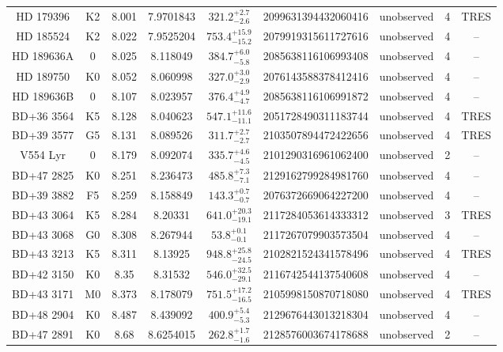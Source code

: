 \begin{table*}
\begin{tabular}{ccccccccc}
HD 179396 & K2 & 8.001 & 7.9701843 & $321.2^{+2.7}_{-2.6}$ & 2099631394432060416 & unobserved & 4 & TRES \\
HD 185524 & K2 & 8.022 & 7.9525204 & $753.4^{+15.9}_{-15.2}$ & 2079919315611727616 & unobserved & 4 & -- \\
HD 189636A & 0 & 8.025 & 8.118049 & $384.7^{+6.0}_{-5.8}$ & 2085638116106993408 & unobserved & 4 & -- \\
HD 189750 & K0 & 8.052 & 8.060998 & $327.0^{+3.0}_{-2.9}$ & 2076143588378412416 & unobserved & 4 & -- \\
HD 189636B & 0 & 8.107 & 8.023957 & $376.4^{+4.9}_{-4.7}$ & 2085638116106991872 & unobserved & 4 & -- \\
BD+36 3564 & K5 & 8.128 & 8.040623 & $547.1^{+11.6}_{-11.1}$ & 2051728490311183744 & unobserved & 4 & TRES \\
BD+39 3577 & G5 & 8.131 & 8.089526 & $311.7^{+2.7}_{-2.7}$ & 2103507894472422656 & unobserved & 4 & TRES \\
V554 Lyr & 0 & 8.179 & 8.092074 & $335.7^{+4.6}_{-4.5}$ & 2101290316961062400 & unobserved & 2 & -- \\
BD+47 2825 & K0 & 8.251 & 8.236473 & $485.8^{+7.3}_{-7.1}$ & 2129162799284981760 & unobserved & 4 & -- \\
BD+39 3882 & F5 & 8.259 & 8.158849 & $143.3^{+0.7}_{-0.7}$ & 2076372669064227200 & unobserved & 4 & -- \\
BD+43 3064 & K5 & 8.284 & 8.20331 & $641.0^{+20.3}_{-19.1}$ & 2117284053614333312 & unobserved & 3 & TRES \\
BD+43 3068 & G0 & 8.308 & 8.267944 & $53.8^{+0.1}_{-0.1}$ & 2117267079903573504 & unobserved & 4 & -- \\
BD+43 3213 & K5 & 8.311 & 8.13925 & $948.8^{+25.8}_{-24.5}$ & 2102821524341578496 & unobserved & 4 & TRES \\
BD+42 3150 & K0 & 8.35 & 8.31532 & $546.0^{+32.5}_{-29.1}$ & 2116742544137540608 & unobserved & 4 & -- \\
BD+43 3171 & M0 & 8.373 & 8.178079 & $751.5^{+17.2}_{-16.5}$ & 2105998150870718080 & unobserved & 4 & TRES \\
BD+48 2904 & K0 & 8.487 & 8.439092 & $400.9^{+5.4}_{-5.3}$ & 2129676443013218304 & unobserved & 4 & -- \\
BD+47 2891 & K0 & 8.68 & 8.6254015 & $262.8^{+1.7}_{-1.6}$ & 2128576003674178688 & unobserved & 2 & -- \\
\hline
\end{tabular}
\end{table*}
